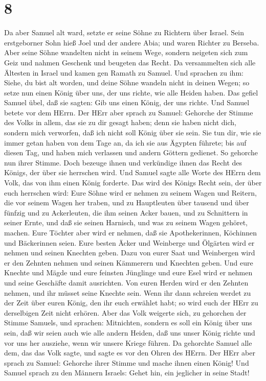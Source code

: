 \hypertarget{section-7}{%
\section{8}\label{section-7}}

 Da aber Samuel alt ward, setzte er seine Söhne zu Richtern
über Israel.  Sein erstgeborner Sohn hieß Joel und der
andere Abia; und waren Richter zu Berseba.  Aber seine Söhne
wandelten nicht in seinem Wege, sondern neigeten sich zum Geiz und
nahmen Geschenk und beugeten das Recht.  Da versammelten
sich alle Ältesten in Israel und kamen gen Ramath zu Samuel.
 Und sprachen zu ihm: Siehe, du bist alt worden, und deine
Söhne wandeln nicht in deinen Wegen; so setze nun einen König über uns,
der uns richte, wie alle Heiden haben.  Das gefiel Samuel
übel, daß sie sagten: Gib uns einen König, der uns richte. Und Samuel
betete vor dem HErrn.  Der HErr aber sprach zu Samuel:
Gehorche der Stimme des Volks in allem, das sie zu dir gesagt haben;
denn sie haben nicht dich, sondern mich verworfen, daß ich nicht soll
König über sie sein.  Sie tun dir, wie sie immer getan haben
von dem Tage an, da ich sie aus Ägypten führete; bis auf diesen Tag, und
haben mich verlassen und andern Göttern gedienet.  So
gehorche nun ihrer Stimme. Doch bezeuge ihnen und verkündige ihnen das
Recht des Königs, der über sie herrschen wird.  Und Samuel
sagte alle Worte des HErrn dem Volk, das von ihm einen König forderte.
 Das wird des Königs Recht sein, der über euch herrschen
wird: Eure Söhne wird er nehmen zu seinem Wagen und Reitern, die vor
seinem Wagen her traben,  und zu Hauptleuten über tausend
und über fünfzig und zu Ackerleuten, die ihm seinen Acker bauen, und zu
Schnittern in seiner Ernte, und daß sie seinen Harnisch, und was zu
seinem Wagen gehöret, machen.  Eure Töchter aber wird er
nehmen, daß sie Apothekerinnen, Köchinnen und Bäckerinnen seien.
 Eure besten Äcker und Weinberge und Ölgärten wird er
nehmen und seinen Knechten geben.  Dazu von eurer Saat und
Weinbergen wird er den Zehnten nehmen und seinen Kämmerern und Knechten
geben.  Und eure Knechte und Mägde und eure feinsten
Jünglinge und eure Esel wird er nehmen und seine Geschäfte damit
ausrichten.  Von euren Herden wird er den Zehnten nehmen,
und ihr müsset seine Knechte sein.  Wenn ihr dann schreien
werdet zu der Zeit über euren König, den ihr euch erwählet habt; so wird
euch der HErr zu derselbigen Zeit nicht erhören.  Aber das
Volk weigerte sich, zu gehorchen der Stimme Samuels, und sprachen:
Mitnichten, sondern es soll ein König über uns sein,  daß
wir seien auch wie alle andern Heiden, daß uns unser König richte und
vor uns her ausziehe, wenn wir unsere Kriege führen.  Da
gehorchte Samuel alle dem, das das Volk sagte, und sagte es vor den
Ohren des HErrn.  Der HErr aber sprach zu Samuel: Gehorche
ihrer Stimme und mache ihnen einen König! Und Samuel sprach zu den
Männern Israels: Gehet hin, ein jeglicher in seine Stadt!

